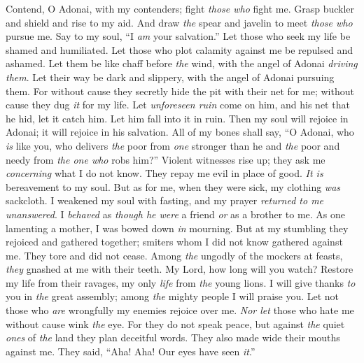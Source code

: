 \begin{biblechapter} %
 Contend, O Adonai, with my contenders; 
fight \textit{those who} fight me.
\verse Grasp buckler and shield 
and rise to my aid.
\verse And draw \textit{the} spear and javelin to meet \textit{those who} pursue me. 
Say to my soul, “I \textit{am} your salvation.”
\verse Let those who seek my life be shamed and humiliated. 
Let those who plot calamity against me be repulsed and ashamed.
\verse Let them be like chaff before \textit{the} wind, 
with the angel of Adonai \textit{driving them}.
\verse Let their way be dark and slippery, 
with the angel of Adonai pursuing them.
\verse For without cause they secretly hide the pit with their net for me; 
without cause they dug \textit{it} for my life.
\verse Let \textit{unforeseen ruin} come on him, 
and his net that he hid, let it catch him. 
Let him fall into it in ruin.
\verse Then my soul will rejoice in Adonai; 
it will rejoice in his salvation.
\verse All of my bones shall say, “O Adonai, who \textit{is} like you, 
who delivers \textit{the} poor from \textit{one} stronger than he 
and \textit{the} poor and needy from \textit{the one who} robs him?”
\verse Violent witnesses rise up; 
they ask me \textit{concerning} what I do not know.
\verse They repay me evil in place of good. 
\textit{It is} bereavement to my soul.
\verse But as for me, when they were sick, my clothing \textit{was} sackcloth. 
I weakened my soul with fasting, 
and my prayer \textit{returned to me unanswered}.
\verse I \textit{behaved} as \textit{though he were} a friend \textit{or} as a brother to me. 
As one lamenting a mother, I was bowed down \textit{in} mourning.
\verse But at my stumbling they rejoiced and gathered together; 
smiters whom I did not know gathered against me. 
They tore and did not cease.
\verse Among \textit{the} ungodly of the mockers at feasts, 
\textit{they} gnashed at me with their teeth.
\verse My Lord, how long will you watch? 
Restore my life from their ravages, 
my only \textit{life} from \textit{the} young lions.
\verse I will give thanks \textit{to} you in \textit{the} great assembly; 
among \textit{the} mighty people I will praise you.
\verse Let not those who \textit{are} wrongfully my enemies rejoice over me. 
\textit{Nor let} those who hate me without cause wink \textit{the} eye.
\verse For they do not speak peace, 
but against \textit{the} quiet \textit{ones} of \textit{the} land 
they plan deceitful words.
\verse They also made wide their mouths against me. 
They said, “Aha! Aha! 
Our eyes have seen \textit{it}.”

\end{biblechapter}
